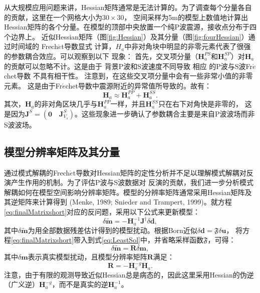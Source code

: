 从大规模应用问题来讲，Hessian矩阵通常是无法计算的。为了调查每个分量各自的贡献，这里在一个网格大小为$30\times30$，
空间采样为5m的模型上数值地计算出Hessian矩阵的各个分量。在模型的顶部中央放置一个纯P波震源，接收点分布于四个边界上。
近似Hessian矩阵（图\ref{fig:Hessian}）及其分量（图\ref{fig:fourHessian}）通过时间域的
Frech{$\acute{e}$}t导数显式
计算，$H_a$中非对角块中明显的非零元素代表了很强的参数耦合效应。可以观察到以下
现象：
首先，交叉项分量（$\mathbf{H}_a^{PS}$和$\mathbf{H}_a^{SP}$）对$\mathbf{H}_a$的贡献可以忽略不计。这是由于
背景P波和S波速度不同导致
相应
的P波与S波Fr{$\acute{e}$}chet导数
不具有相干性。
注意到，在这些交叉项分量中会有一些非常小值的非零元素。
这是由于Fr{$\acute{e}$}chet导数中震源附近的异常值所导致的。故有：
\begin{equation}
        \mathbf{H}_a\approx
        \mathbf{H}_a^{PP}+
        \mathbf{H}_a^{SS}.
        \label{eq:C3}
\end{equation}
其次，$\mathbf{H}_a$的非对角区块几乎与$\mathbf{H}_a^{PP}$一样，并且$\mathbf{H}_a^{SS}$只在右下对角快是非零的，
这是因为$\mathbf{J}^S=(\mathbf{0}\quad\mathbf{J}^S_{V_s})$。这些现象进一步确认了参数耦合主要是来自P波波场而非S波波场。
\subsection{模型分辨率矩阵及其分量}
通过模式解耦的Frech{$\acute{e}$}t导数对Hessian矩阵的定性分析并不足以理解模式解耦对反演产生作用的机制。为了评估P波与S波数据对
反演的贡献，我们进一步分析模式解耦如何在模型空间影响分辨率矩阵。模型的分辨率矩阵通常采用Hessian矩阵及其逆矩阵来计算得到
(Menke, 1989\cite[]{menke:1989}; Snieder and Trampert, 1999\cite{snieder1999inverse})。就方程\eqref{eq:finalMatrixshort}对应的反问题，采用以下公式来更新模型：
\begin{equation}
	\delta \tilde{\mathbf{m}}=-\mathbf{H}^{-1}_a\mathbf{J}^{\dagger}\delta 
        \mathbf{d},
        \label{eq:LeastSol}
\end{equation}
其中$\delta\tilde{\mathbf{m}}$为用全部数据残差估计得到的模型扰动。根据Born近似$\delta\mathbf{d}=\mathfrak{F}{\delta\mathbf{u}}$，
将方程\eqref{eq:finalMatrixshort}带入到式\eqref{eq:LeastSol}中，并省略采样函数$\mathfrak{F}$，可得：
\begin{equation}
	\delta \tilde{\mathbf{m}}=\mathbf{R}\delta \mathbf{m},
	\label{eq:ResoMatr}
\end{equation}
其中$\delta \mathbf{m}$表示真实模型扰动，且模型分辨率矩阵$\mathbf{R}$满足：
\begin{equation}
        \mathbf{R}=-\mathbf{H}^{-g}_a\mathbf{H}_a. 
        \label{eq:ResoOper} 
\end{equation}
注意，由于有限的观测导致近似Hessian总是病态的，因此这里采用Hessian的伪逆（广义逆）$\mathbf{H}^{-g}_a$，而不是真实的逆$\mathbf{H}^{-1}_a$。

